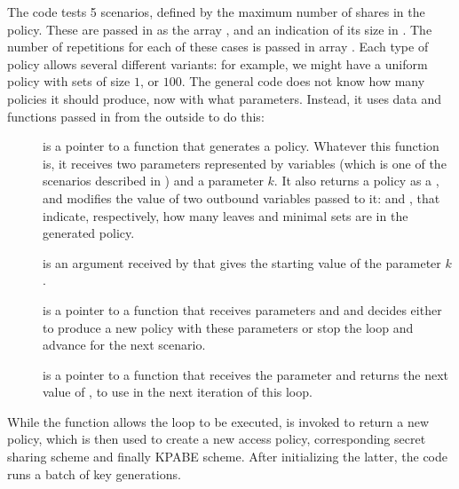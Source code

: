 \documentclass{article}
\begin{document}

The code tests 5 scenarios, defined by the maximum number of shares in the policy. These are passed in as the array , and an indication of its size in . The number of repetitions for each of these cases is passed in array . Each type of policy allows several different variants: for example, we might have a uniform policy with sets of size $1$, or $100$. The general code does not know how many policies it should produce, now with what parameters. Instead, it uses data and functions passed in from the outside to do this:
\begin{description}
\item[] is a  pointer to a function that generates a policy. Whatever this function is, it receives two parameters represented by variables  (which is one of the scenarios described in ) and a parameter $k$. It also returns a policy as a , and modifies the value of two outbound variables passed to it:  and , that indicate, respectively, how many leaves and minimal sets are in the generated policy.
\item[] is an argument received by  that gives the starting value of the parameter $k$.
\item[] is a pointer to a function that receives parameters  and  and decides either to produce a new policy with these parameters or stop the loop and advance for the next scenario.
\item[] is a pointer to a function that receives the parameter  and returns the next value of , to use in the next iteration of this loop.
\end{description}

While the function  allows the  loop to be executed,  is invoked to return a new policy, which is then used to create a new access policy, corresponding secret sharing scheme and finally KPABE scheme. After initializing the latter, the code runs a batch of key generations.
\end{document}
